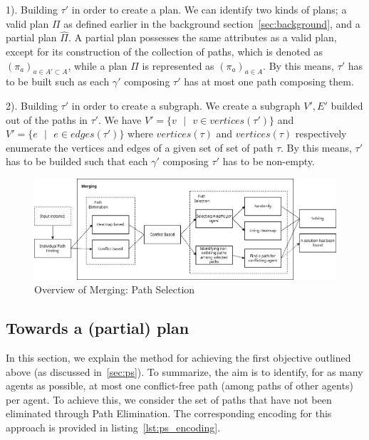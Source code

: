 1). Building \(\tau'\) in order to create a plan. We can identify two kinds of plans; a valid plan \(\Pi\) as defined earlier in the background section~\ref{sec:background}, and a partial plan \(\hat{\Pi}\). A partial plan possesses the same attributes as a valid plan, except for its construction of the collection of paths, which is denoted as \((\pi_a)_{a \in A' \subset A}\), while a plan \(\Pi\) is represented as \((\pi_a)_{a \in A}\). By this means, \(\tau'\) has to be built such as each \(\gamma'\) composing \(\tau'\) has at most one path composing them. 

2). Building \(\tau'\) in order to create a subgraph. We create a subgraph \(V',E'\) builded out of the paths in \(\tau'\). We have 
\(V' = \{v \text{ }|\text{ } v \in vertices(\tau')\} \)  and \(V' = \{e \text{ }|\text{ } e \in edges(\tau')  \} \) where \(vertices(\tau)\) and \(vertices(\tau)\) respectively enumerate the vertices and edges of a given set of set of path \(\tau\). By this means, \(\tau'\) has to be builded such that each \(\gamma'\) composing \(\tau'\) has to be non-empty. 


\begin{figure}[H]
    \centering
    \caption{Overview of Merging: Path Selection}\label{fig:overview_merging_path_selection}
    \includegraphics[width=\widthimg]{img/overview_merging_path_selection.drawio.png}
\end{figure}



\subsection{Towards a (partial) plan}

In this section, we explain the method for achieving the first objective outlined above (as discussed in~\ref{sec:ps}). To summarize, the aim is to identify, for as many agents as possible, at most one conflict-free path (among paths of other agents) per agent. To achieve this, we consider the set of paths that have not been eliminated through Path Elimination. The corresponding encoding for this approach is provided in listing~\ref{lst:ps_encoding}.

